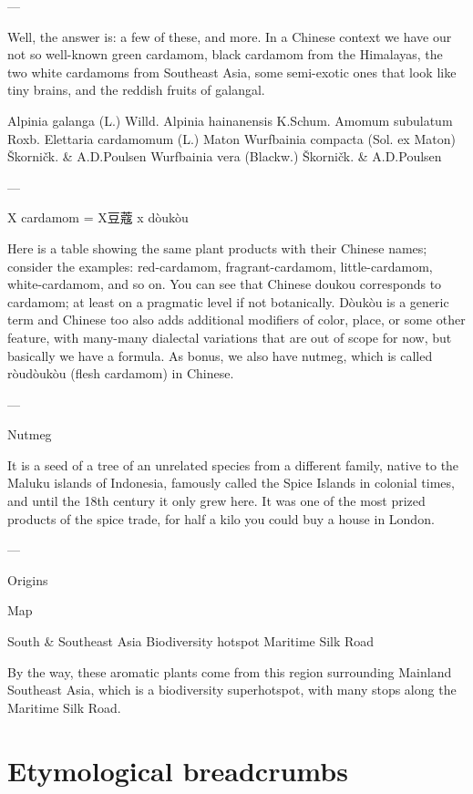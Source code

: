 \documentclass[12pt]{article}
\begin{document}
---

Well, the answer is: a few of these, and more. In a Chinese context we have our not so well-known green cardamom, black cardamom from the Himalayas, the two white cardamoms from Southeast Asia, some semi-exotic ones that look like tiny brains, and the reddish fruits of galangal.

Alpinia galanga (L.) Willd. 
Alpinia hainanensis K.Schum.	
Amomum subulatum Roxb.	
Elettaria cardamomum (L.) Maton 
Wurfbainia compacta (Sol. ex Maton) Škorničk. \& A.D.Poulsen
Wurfbainia vera (Blackw.) Škorničk. \& A.D.Poulsen

---

X cardamom  = X豆蔻 x dòukòu



Here is a table showing the same plant products with their Chinese names; consider the examples: red-cardamom, fragrant-cardamom, little-cardamom, white-cardamom, and so on.
You can see that Chinese doukou corresponds to cardamom; at least on a pragmatic level if not botanically. 
Dòukòu is a generic term and Chinese too also adds additional modifiers of color, place, or some other feature, with many-many dialectal variations that are out of scope for now, but basically we have a formula.
As bonus, we also have nutmeg, which is called ròudòukòu (flesh cardamom) in Chinese.

---

Nutmeg

It is a seed of a tree of an unrelated species from a different family, native to the Maluku islands of Indonesia, famously called the Spice Islands in colonial times, and until the 18th century it only grew here. It was one of the most prized products of the spice trade, for half a kilo you could buy a house in London. 


---

Origins

Map

South \& Southeast Asia
Biodiversity hotspot
Maritime Silk Road

By the way, these aromatic plants come from this region surrounding Mainland Southeast Asia, which is a biodiversity superhotspot, with many stops along the Maritime Silk Road.









\section{Etymological breadcrumbs}\label{sec:etymology}
\end{document}
